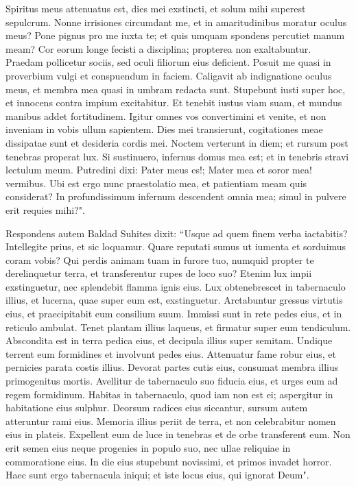 \begin{biblechapter}  
\verse Spiritus meus attenuatus est, dies mei exstincti, et solum mihi superest sepulcrum. 
\verse Nonne irrisiones circumdant me, et in amaritudinibus moratur oculus meus? 
\verse Pone pignus pro me iuxta te; et quis umquam spondens percutiet manum meam? 
\verse Cor eorum longe fecisti a disciplina; propterea non exaltabuntur. 
\verse Praedam pollicetur sociis, sed oculi filiorum eius deficient. 
\verse Posuit me quasi in proverbium vulgi et conspuendum in faciem. 
\verse Caligavit ab indignatione oculus meus, et membra mea quasi in umbram redacta sunt. 
\verse Stupebunt iusti super hoc, et innocens contra impium excitabitur. 
\verse Et tenebit iustus viam suam, et mundus manibus addet fortitudinem. 
\verse Igitur omnes vos convertimini et venite, et non inveniam in vobis ullum sapientem. 
\verse Dies mei transierunt, cogitationes meae dissipatae sunt et desideria cordis mei. 
\verse Noctem verterunt in diem; et rursum post tenebras properat lux. 
\verse Si sustinuero, infernus domus mea est; et in tenebris stravi lectulum meum. 
\verse Putredini dixi: Pater meus es!; Mater mea et soror mea! vermibus. 
\verse Ubi est ergo nunc praestolatio mea, et patientiam meam quis considerat? 
\verse In profundissimum infernum descendent omnia mea; simul in pulvere erit requies mihi?". 
\end{biblechapter}

\begin{biblechapter}  
\verse Respondens autem Baldad Suhites dixit: 
\verse “Usque ad quem finem verba iactabitis? Intellegite prius, et sic loquamur. 
\verse Quare reputati sumus ut iumenta et sorduimus coram vobis? 
\verse Qui perdis animam tuam in furore tuo, numquid propter te derelinquetur terra, et transferentur rupes de loco suo? 
\verse Etenim lux impii exstinguetur, nec splendebit flamma ignis eius. 
\verse Lux obtenebrescet in tabernaculo illius, et lucerna, quae super eum est, exstinguetur. 
\verse Arctabuntur gressus virtutis eius, et praecipitabit eum consilium suum. 
\verse Immissi sunt in rete pedes eius, et in reticulo ambulat. 
\verse Tenet plantam illius laqueus, et firmatur super eum tendiculum. 
\verse Abscondita est in terra pedica eius, et decipula illius super semitam. 
\verse Undique terrent eum formidines et involvunt pedes eius. 
\verse Attenuatur fame robur eius, et pernicies parata costis illius. 
\verse Devorat partes cutis eius, consumat membra illius primogenitus mortis. 
\verse Avellitur de tabernaculo suo fiducia eius, et urges eum ad regem formidinum. 
\verse Habitas in tabernaculo, quod iam non est ei; aspergitur in habitatione eius sulphur. 
\verse Deorsum radices eius siccantur, sursum autem atteruntur rami eius. 
\verse Memoria illius periit de terra, et non celebrabitur nomen eius in plateis. 
\verse Expellent eum de luce in tenebras et de orbe transferent eum. 
\verse Non erit semen eius neque progenies in populo suo, nec ullae reliquiae in commoratione eius. 
\verse In die eius stupebunt novissimi, et primos invadet horror. 
\verse Haec sunt ergo tabernacula iniqui; et iste locus eius, qui ignorat Deum". 
\end{biblechapter}

